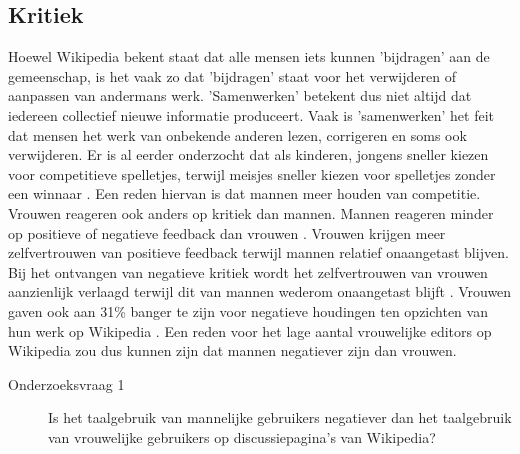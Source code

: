 \subsection{Kritiek}
Hoewel Wikipedia bekent staat dat alle mensen iets kunnen 'bijdragen' aan de gemeenschap, is het vaak zo dat 'bijdragen' staat voor het verwijderen of aanpassen van andermans werk. 'Samenwerken' betekent dus niet altijd dat iedereen collectief nieuwe informatie produceert. Vaak is 'samenwerken' het feit dat mensen het werk van onbekende anderen lezen, corrigeren en soms ook verwijderen. Er is al eerder onderzocht dat als kinderen, jongens sneller kiezen voor competitieve spelletjes, terwijl meisjes sneller kiezen voor spelletjes zonder een winnaar \citep{campbell2013mind}. Een reden hiervan is dat mannen meer houden van competitie. Vrouwen reageren ook anders op kritiek dan mannen. Mannen reageren minder op positieve of negatieve feedback dan vrouwen \citep{roberts1994gender}. Vrouwen krijgen meer zelfvertrouwen van positieve feedback terwijl mannen relatief onaangetast blijven. Bij het ontvangen van negatieve kritiek wordt het zelfvertrouwen van vrouwen aanzienlijk verlaagd terwijl dit van mannen wederom onaangetast blijft \citep{roberts1994gender}. Vrouwen gaven ook aan 31\% banger te zijn voor negatieve houdingen ten opzichten van hun werk op Wikipedia \citep{collier2012conflict}. Een reden voor het lage aantal vrouwelijke editors op Wikipedia zou dus kunnen zijn dat mannen negatiever zijn dan vrouwen. 

\begin{description}
\item[Onderzoeksvraag 1] Is het taalgebruik van mannelijke gebruikers negatiever dan het taalgebruik van vrouwelijke gebruikers op discussiepagina's van Wikipedia?
\end{description}

